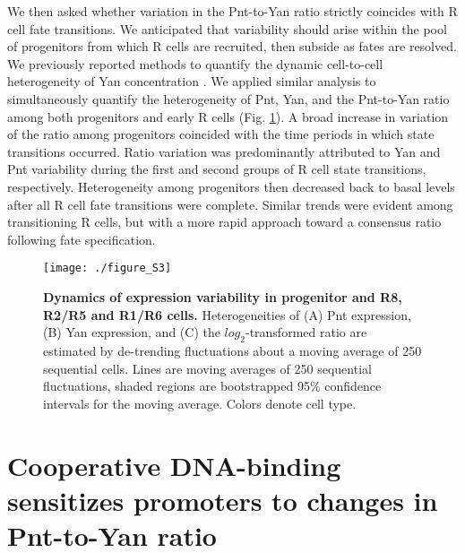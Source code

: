 We then asked whether variation in the Pnt-to-Yan ratio strictly coincides with R cell fate transitions. We anticipated that variability should arise within the pool of progenitors from which R cells are recruited, then subside as fates are resolved. We previously reported methods to quantify the dynamic cell-to-cell heterogeneity of Yan concentration \cite{Pelaez2015a}. We applied similar analysis to simultaneously quantify the heterogeneity of Pnt, Yan, and the Pnt-to-Yan ratio among both progenitors and early R cells (Fig. \ref{fig:ratio:figS3}). A broad increase in variation of the ratio among progenitors coincided with the time periods in which state transitions occurred. Ratio variation was predominantly attributed to Yan and Pnt variability during the first and second groups of R cell state transitions, respectively. Heterogeneity among progenitors then decreased back to basal levels after all R cell fate transitions were complete. Similar trends were evident among transitioning R cells, but with a more rapid approach toward a consensus ratio following fate specification.

\begin{figure}[h]
\centering
\texttt{[image: ./figure\_S3]}
\caption[Dynamics of expression variability in progenitors and R cells.]{\textbf{Dynamics of expression variability in progenitor and R8, R2/R5 and R1/R6 cells.} Heterogeneities of (A) Pnt expression, (B) Yan expression, and (C) the $log_2$-transformed ratio are estimated by de-trending fluctuations about a moving average of 250 sequential cells. Lines are moving averages of 250 sequential fluctuations, shaded regions are bootstrapped 95\% confidence intervals for the moving average. Colors denote cell type.}
\label{fig:ratio:figS3}
\end{figure}

\section{Cooperative DNA-binding sensitizes promoters to changes in Pnt-to-Yan ratio}

